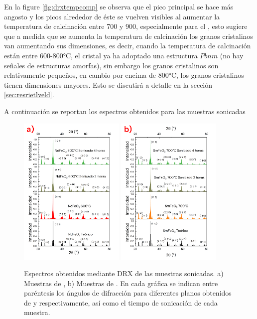 \documentclass[../main.tex]{subfiles}
\begin{document}
En la figure \ref{fig:drxtempcomp} se observa que el pico principal se hace más angosto y los picos alrededor de éste se vuelven visibles al aumentar la temperatura de calcinación entre 700 y 900\gradoC{}, especialmente para el \neod{}, esto sugiere que a medida que se aumenta la temperatura de calcinación los granos cristalinos van aumentando sus dimensiones, es decir, cuando la temperatura de calcinación están entre 600-800°C, el cristal ya ha adoptado una estructura $Pbnm$ (no hay señales de estructuras amorfas), sin embargo los granos cristalinos son relativamente pequeños, en cambio por encima de 800°C, los granos cristalinos tienen dimensiones mayores. Esto se discutirá a detalle en la sección \ref{sec:resrietlveld}.

A continuación se reportan los espectros obtenidos para las muestras sonicadas
\begin{figure}[H]
    \centering
    \includegraphics[width=0.45\textwidth]{fig/drxsonicndfeo3.png}
    \quad
    \includegraphics[width=0.45\textwidth]{fig/drxsonicsmfeo3.png}
    \caption{Espectros obtenidos mediante DRX de las muestras sonicadas. a) Muestras de \neod{}, b) Muestras de \sama{}. En cada gráfica se indican entre paréntesis los ángulos de difracción para diferentes planos obtenidos de \cite{ndfeo3} y \cite{smfeo3} respectivamente, así como el tiempo de sonicación de cada muestra.}
    \label{fig:drxsoniccomp}
\end{figure}
\end{document}
